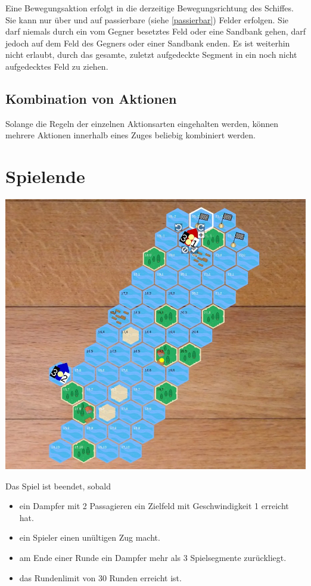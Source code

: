 \documentclass[12pt,a4paper, ngerman, oneside]{scrartcl}
\begin{document}
Eine Bewegungsaktion erfolgt in die derzeitige Bewegungsrichtung des Schiffes.
Sie kann nur über und auf passierbare (siehe \ref{passierbar}) Felder erfolgen.
Sie darf niemals durch ein vom Gegner besetztes Feld oder eine Sandbank gehen,
darf jedoch auf dem Feld des Gegners oder einer Sandbank enden. Es ist weiterhin
nicht erlaubt, durch das gesamte, zuletzt aufgedeckte Segment in ein noch nicht
aufgedecktes Feld zu ziehen.

\subsection{Kombination von Aktionen}

Solange die Regeln der einzelnen Aktionsarten eingehalten werden, können mehrere
Aktionen innerhalb eines Zuges beliebig kombiniert werden.

\section{Spielende}\label{sec:spielende}

\begin{centering}
  \includegraphics[width=\textwidth]{bilder/spielfeld-ziel.jpg}
\end{centering}

Das Spiel ist beendet, sobald

\begin{itemize}
\item ein Dampfer mit 2 Passagieren ein Zielfeld mit Geschwindigkeit 1 erreicht hat.
\item ein Spieler einen unültigen Zug macht.
\item am Ende einer Runde ein Dampfer mehr als 3 Spielsegmente zurückliegt.
  \item das Rundenlimit von 30 Runden erreicht ist.
\end{itemize}
\end{document}
